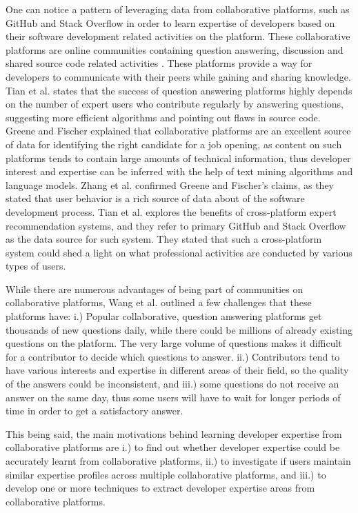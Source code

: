         One can notice a pattern of leveraging data from collaborative platforms, such as GitHub and Stack Overflow in order to learn expertise of developers based on their software development related activities on the platform. These collaborative platforms are online communities containing question answering, discussion and shared source code related activities \cite{wang2018survey}. These platforms provide a way for developers to communicate with their peers while gaining and sharing knowledge. Tian et al. \cite{tian2019geek} states that the success of question answering platforms highly depends on the number of expert users who contribute regularly by answering questions, suggesting more efficient algorithms and pointing out flaws in source code. Greene and Fischer \cite{greene2016cvexplorer} explained that collaborative platforms are an excellent source of data for identifying the right candidate for a job opening, as content on such platforms tends to contain large amounts of technical information, thus developer interest and expertise can be inferred with the help of text mining algorithms and language models. Zhang et al. \cite{zhang2014recommending} confirmed Greene and Fischer's claims, as they stated that user behavior is a rich source of data about of the software development process. Tian et al. \cite{tian2019geek} explores the benefits of cross-platform expert recommendation systems, and they refer to primary GitHub and Stack Overflow as the data source for such system. They stated that such a cross-platform system could shed a light on what professional activities are conducted by various types of users. 
        
        While there are numerous advantages of being part of communities on collaborative platforms, Wang et al. \cite{wang2018survey} outlined a few challenges that these platforms have: i.) Popular collaborative, question answering platforms get thousands of new questions daily, while there could be millions of already existing questions on the platform. The very large volume of questions makes it difficult for a contributor to decide which questions to answer. ii.) Contributors tend to have various interests and expertise in different areas of their field, so the quality of the answers could be inconsistent, and iii.) some questions do not receive an answer on the same day, thus some users will have to wait for longer periods of time in order to get a satisfactory answer. 
        
        This being said, the main motivations behind learning developer expertise from collaborative platforms are i.) to find out whether developer expertise could be accurately learnt from collaborative platforms, ii.) to investigate if users maintain similar expertise profiles across multiple collaborative platforms, and iii.) to develop one or more techniques to extract developer expertise areas from collaborative platforms.

